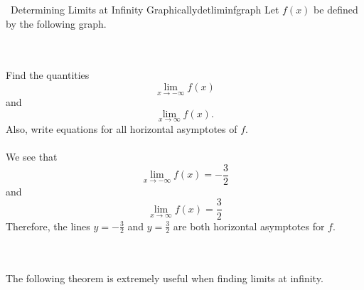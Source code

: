         \begin{example}{\Difficulty\,\Difficulty\,\,Determining Limits at Infinity Graphically}{detliminfgraph}
            Let \(f(x)\) be defined by the following graph.
            \begin{center}
            \end{center}
            \vphantom
            \\
            \\
            Find the quantities
            \begin{equation*}
                \lim_{x\to-\infty}f(x)
            \end{equation*}
            and
            \begin{equation*}
                \lim_{x\to\infty}f(x).
            \end{equation*}
            Also, write equations for all horizontal asymptotes of \(f\).
            \\
            \\
            We see that
            \begin{equation*}
                \lim_{x\to-\infty}f(x)=-\frac{3}{2}
            \end{equation*}
            and
            \begin{equation*}
                \lim_{x\to\infty}f(x)=\frac{3}{2}
            \end{equation*}
            Therefore, the lines \(y=-\frac{3}{2}\) and \(y=\frac{3}{2}\) are both horizontal asymptotes for \(f\).
        \end{example}
        \pagebreak
        \vphantom
        \\
        \\
        The following theorem is extremely useful when finding limits at infinity.
